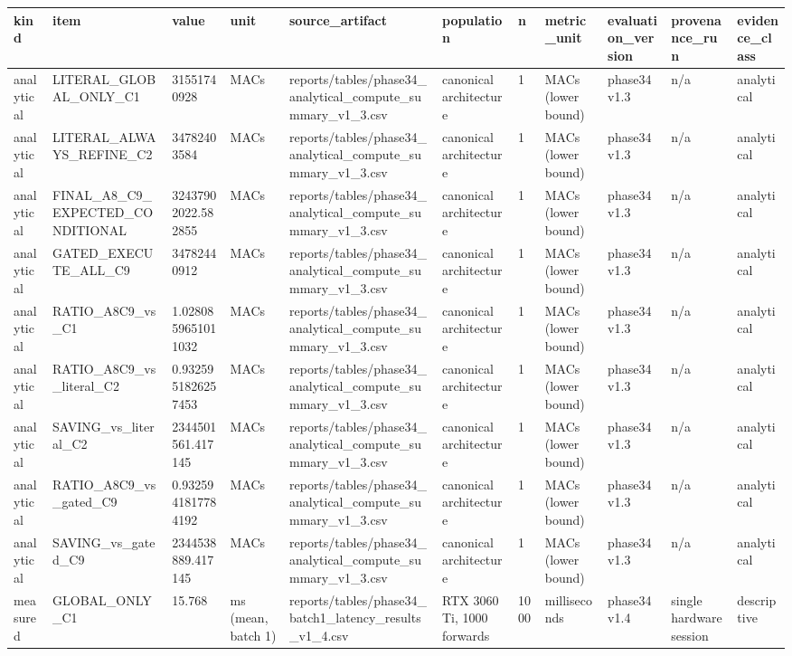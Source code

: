 \begin{tabular}{lllllllllll}
\hline
kind & item & value & unit & source\_artifact & population & n & metric\_unit & evaluation\_version & provenance\_run & evidence\_class \\
\hline
analytical & LITERAL\_GLOBAL\_ONLY\_C1 & 31551740928 & MACs & reports/tables/phase34\_analytical\_compute\_summary\_v1\_3.csv & canonical architecture & 1 & MACs (lower bound) & phase34 v1.3 & n/a & analytical \\
analytical & LITERAL\_ALWAYS\_REFINE\_C2 & 34782403584 & MACs & reports/tables/phase34\_analytical\_compute\_summary\_v1\_3.csv & canonical architecture & 1 & MACs (lower bound) & phase34 v1.3 & n/a & analytical \\
analytical & FINAL\_A8\_C9\_EXPECTED\_CONDITIONAL & 32437902022.582855 & MACs & reports/tables/phase34\_analytical\_compute\_summary\_v1\_3.csv & canonical architecture & 1 & MACs (lower bound) & phase34 v1.3 & n/a & analytical \\
analytical & GATED\_EXECUTE\_ALL\_C9 & 34782440912 & MACs & reports/tables/phase34\_analytical\_compute\_summary\_v1\_3.csv & canonical architecture & 1 & MACs (lower bound) & phase34 v1.3 & n/a & analytical \\
analytical & RATIO\_A8C9\_vs\_C1 & 1.0280859651011032 & MACs & reports/tables/phase34\_analytical\_compute\_summary\_v1\_3.csv & canonical architecture & 1 & MACs (lower bound) & phase34 v1.3 & n/a & analytical \\
analytical & RATIO\_A8C9\_vs\_literal\_C2 & 0.9325951826257453 & MACs & reports/tables/phase34\_analytical\_compute\_summary\_v1\_3.csv & canonical architecture & 1 & MACs (lower bound) & phase34 v1.3 & n/a & analytical \\
analytical & SAVING\_vs\_literal\_C2 & 2344501561.417145 & MACs & reports/tables/phase34\_analytical\_compute\_summary\_v1\_3.csv & canonical architecture & 1 & MACs (lower bound) & phase34 v1.3 & n/a & analytical \\
analytical & RATIO\_A8C9\_vs\_gated\_C9 & 0.9325941817784192 & MACs & reports/tables/phase34\_analytical\_compute\_summary\_v1\_3.csv & canonical architecture & 1 & MACs (lower bound) & phase34 v1.3 & n/a & analytical \\
analytical & SAVING\_vs\_gated\_C9 & 2344538889.417145 & MACs & reports/tables/phase34\_analytical\_compute\_summary\_v1\_3.csv & canonical architecture & 1 & MACs (lower bound) & phase34 v1.3 & n/a & analytical \\
measured & GLOBAL\_ONLY\_C1 & 15.768 & ms (mean, batch 1) & reports/tables/phase34\_batch1\_latency\_results\_v1\_4.csv & RTX 3060 Ti, 1000 forwards & 1000 & milliseconds & phase34 v1.4 & single hardware session & descriptive \\

\end{tabular}

